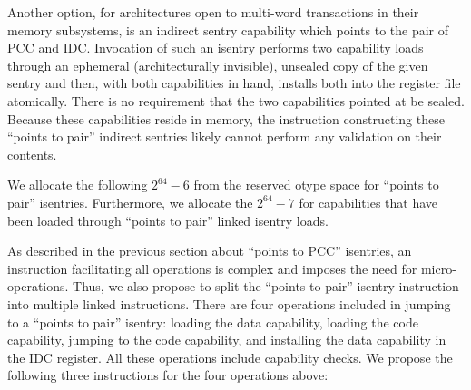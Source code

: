 Another option, for architectures open to multi-word transactions in their
memory subsystems, is an indirect sentry capability which points to the pair of
PCC and IDC.  Invocation of such an isentry performs two capability loads through
an ephemeral (architecturally invisible), unsealed copy of the given sentry and
then, with both capabilities in hand, installs both into the register file
atomically.  There is no requirement that the two capabilities pointed at be
sealed.  Because these capabilities reside in memory, the instruction
constructing these ``points to pair'' indirect sentries likely cannot perform
any validation on their contents.

We allocate the following \cotype{} $2^{64} - 6$ from the reserved otype space for ``points to pair'' isentries.
Furthermore, we allocate the \cotype{} $2^{64} - 7$ for capabilities that have been loaded through ``points to pair'' linked isentry loads.

As described in the previous section about ``points to PCC'' isentries, an
instruction facilitating all operations is complex and imposes the need for
micro-operations. Thus, we also propose to split the ``points to pair'' isentry
instruction into multiple linked instructions.
There are four operations included in jumping to a ``points to pair'' isentry: loading the data capability, loading the code capability, jumping to the code capability, and installing the data capability in the IDC register.
All these operations include capability checks.
We propose the following three instructions for the four operations above:

